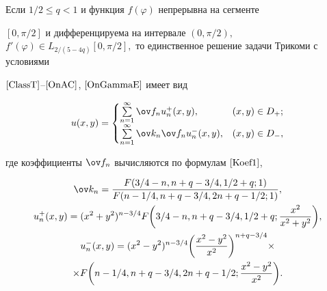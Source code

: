 \begin{thm}


Если $1/2\leq q<1$ и функция $f(\varphi)$ непрерывна на сегменте


$[0,\pi/2]$ и дифференцируема на интервале $(0,\pi/2),$ $f'(\varphi)\in


L_{2/(5-4q)}[0,\pi/2],$ то единственное решение задачи Трикоми с условиями


$\eqref{ClassT}$--$\eqref{OnAC}$, $\eqref{OnGammaE}$ имеет вид


$$


u(x,y) = \begin{cases}


\sum\limits_{n=1}^\infty \ov f_nu_n^+(x,y), & (x,y) \in D_+;\\


\sum\limits_{n=1}^\infty \ov k_n\ov f_nu_n^-(x,y), & (x,y) \in D_-,


\end{cases}


$$


где коэффициенты $\ov f_n$ вычисляются по формулам $\eqref{Koef1}$,


\begin{gather*}


\ov k_n = \frac{ F(3/4-n,n+q-3/4,1/2+q;1)}


{F(n-1/4,n+q-3/4,2n+q-1/2;1)}, \\


%


u^+_n(x,y)=(x^2+y^2)^{n-3/4}


F\bigg({3/4-n},{n+q-3/4},{1/2+q};\frac{x^2}{x^2+y^2}\bigg),\\


%


u^-_n(x,y)=(x^2-y^2)^{n-3/4}\bigg(\frac{x^2-y^2}{x^2}\bigg)^{n+q-3/4}\times\\


%


\times F\bigg({n-1/4},{n+q-3/4},{2n+q-1/2};\frac{x^2-y^2}{x^2}\bigg).


\end{gather*}


\end{thm}











